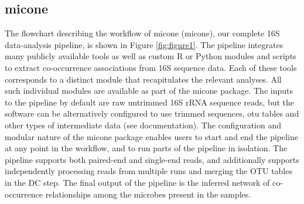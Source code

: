 \documentclass[letterpaper,12pt]{article}
\begin{document}
  \subsection*{\ac{micone}}
  \vspace{-5mm}
  The flowchart describing the workflow of \ac{micone} (\acl{micone}), our complete 16S data-analysis pipeline, is shown in Figure \ref{fig:figure1}.
  The pipeline integrates many publicly available tools as well as custom R or Python modules and scripts to extract co-occurrence associations from 16S sequence data.
  Each of these tools corresponds to a distinct module that recapitulates the relevant analyses.
  All such individual modules are available as part of the \ac{micone} package.
  The inputs to the pipeline by default are raw untrimmed 16S rRNA sequence reads, but the software can be alternatively configured to use trimmed sequences, \ac{otu} tables and other types of intermediate data (see documentation).
  The configuration and modular nature of the \ac{micone} package enables users to start and end the pipeline at any point in the workflow, and to run parts of the pipeline in isolation.
  The pipeline supports both paired-end and single-end reads, and additionally supports independently processing reads from multiple runs and merging the OTU tables in the DC step.
  The final output of the pipeline is the inferred network of co-occurrence relationships among the microbes present in the samples.
\end{document}
